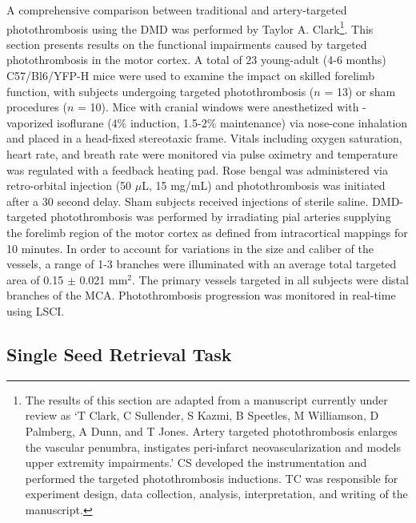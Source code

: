 A comprehensive comparison between traditional and artery-targeted photothrombosis using the DMD was performed by Taylor A. Clark\footnote{The results of this section are adapted from a manuscript currently under review as `T Clark, C Sullender, S Kazmi, B Speetles, M Williamson, D Palmberg, A Dunn, and T Jones. Artery targeted photothrombosis enlarges the vascular penumbra, instigates peri-infarct neovascularization and models upper extremity impairments.' CS developed the instrumentation and performed the targeted photothrombosis inductions. TC was responsible for experiment design, data collection, analysis, interpretation, and writing of the manuscript.}. This section presents results on the functional impairments caused by targeted photothrombosis in the motor cortex. A total of 23 young-adult (4-6 months) C57/Bl6/YFP-H mice were used to examine the impact on skilled forelimb function, with subjects undergoing targeted photothrombosis ($n$ = 13) or sham procedures ($n$ = 10). Mice with cranial windows were anesthetized with -vaporized isoflurane (4\% induction, 1.5-2\% maintenance) via nose-cone inhalation and placed in a head-fixed stereotaxic frame. Vitals including oxygen saturation, heart rate, and breath rate were monitored via pulse oximetry and temperature was regulated with a feedback heating pad. Rose bengal was administered via retro-orbital injection (50 $\mu$L, 15 mg/mL) and photothrombosis was initiated after a 30 second delay. Sham subjects received injections of sterile saline. DMD-targeted photothrombosis was performed by irradiating pial arteries supplying the forelimb region of the motor cortex as defined from intracortical mappings \cite{Tennant:2011cx} for 10 minutes. In order to account for variations in the size and caliber of the vessels, a range of 1-3 branches were illuminated with an average total targeted area of 0.15 $\pm$ 0.021 mm$^2$. The primary vessels targeted in all subjects were distal branches of the MCA. Photothrombosis progression was monitored in real-time using LSCI.

\subsection{Single Seed Retrieval Task}

